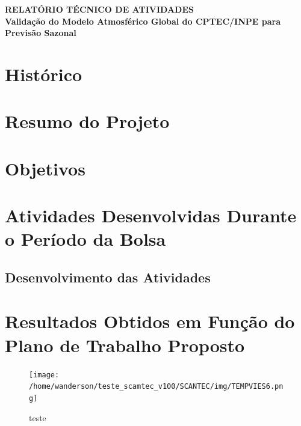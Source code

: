 \documentclass[11pt]{article}
\begin{document}
\begin{center}
    \large{\textbf{RELATÓRIO TÉCNICO DE ATIVIDADES}}\\
    \vspace{1cm}
    \large{\textbf{Validação do Modelo Atmosférico Global do CPTEC/INPE para Previsão Sazonal}}
\end{center}

\section{Histórico}

\newpage

\section{Resumo do Projeto}

\newpage

\section{Objetivos}

\newpage

\section{Atividades Desenvolvidas Durante o Período da Bolsa}

\subsection{Desenvolvimento das Atividades}

\newpage

\section{Resultados Obtidos em Função do Plano de Trabalho Proposto}

\begin{figure}[H]
    \centering
        \texttt{[image: /home/wanderson/teste\_scamtec\_v100/SCANTEC/img/TEMPVIES6.png]}
        \caption{teste}
    \label{fig:teste}
\end{figure}
\end{document}
